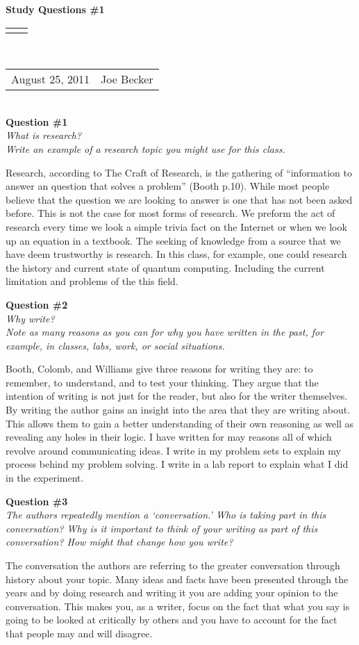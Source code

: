 \documentclass[11pt]{article}
\numberwithin{equation}{section}
\renewcommand{\title}[1]{\textbf{#1}\\}
\renewcommand{\line}{\begin{tabularx}{\textwidth}{X>{\raggedleft}X}\hline\\\end{tabularx}\\[-0.5cm]}
\newcommand{\leftright}[2]{\begin{tabularx}{\textwidth}{X>{\raggedleft}X}#1%
& #2\\\end{tabularx}\\[-0.5cm]}
\begin{document}
\title{Study Questions \#1}
\line
\leftright{August 25, 2011}{Joe Becker} %

\textbf{Question \#1}\\
\indent \textit{\indent What is research?}\\
\indent \textit{\indent Write an example of a research topic you might use for this class.}

Research, according to The Craft of Research, is the gathering of “information to answer an question that solves a problem” (Booth p.10). While most people believe that the question we are looking to answer is one that has not been asked before. This is not the case for most forms of research. We preform the act of research every time we look a simple trivia fact on the Internet or when we look up an equation in a textbook. The seeking of knowledge from a source that we have deem trustworthy is research. In this class, for example, one could research the history and current state of quantum computing. Including the current limitation and problems of the this field.

\textbf{Question \#2}\\
\indent \textit{\indent Why write?}\\
\indent \textit{\indent Note as many reasons as you can for why you have written in the past, for example, in classes, labs, work, or social situations.}

	Booth, Colomb, and Williams give three reasons for writing they are: to remember, to understand, and to test your thinking. They argue that the intention of writing is not just for the reader, but also for the writer themselves. By writing the author gains an insight into the area that they are writing about. This allows them to gain a better understanding of their own reasoning as well as revealing any holes in their logic. I have written for may reasons all of which revolve around communicating ideas. I write in my problem sets to explain my process behind my problem solving. I write in a lab report to explain what I did in the experiment. 

\textbf{Question \#3}\\
\indent \textit{\indent The authors repeatedly mention a ‘conversation.’ Who is taking part in this conversation?  Why is it important to think of your writing as part of this conversation? How might that change how you write?}

The conversation the authors are referring to the greater conversation through history about your topic. Many ideas and facts have been presented through the years and by doing research and writing it you are adding your opinion to the conversation. This makes you, as a writer, focus on the fact that what you say is going to be looked at critically by others and you have to account for the fact that people may and will disagree.
\end{document}
